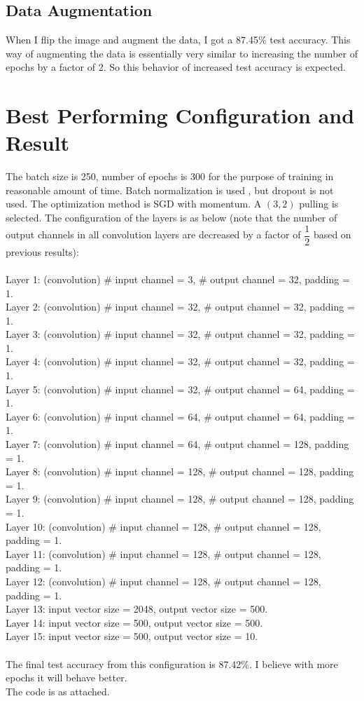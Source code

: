 \subsection{Data Augmentation}
When I flip the image and augment the data, I got a 87.45\% test accuracy. This way of augmenting the data is essentially very similar to increasing the number of epochs by a factor of 2. So this behavior of increased test accuracy is expected. 

\section{Best Performing Configuration and Result}
The batch size is 250, number of epochs is 300 for the purpose of training in reasonable amount of time. Batch normalization is used , but dropout is not used.  The optimization method is SGD with momentum. A $(3,2)$ pulling is selected. The configuration of the layers is as below (note that the number of output channels in all convolution layers are decreased by a factor of $\dfrac{1}{2}$ based on previous results): \\ \\
Layer 1: (convolution) \# input channel = 3, \# output channel = 32,  padding = 1.\\
Layer 2: (convolution) \# input channel = 32, \# output channel = 32,  padding = 1.\\
Layer 3: (convolution) \# input channel = 32, \# output channel = 32,  padding = 1.\\
Layer 4: (convolution) \# input channel = 32, \# output channel = 32,  padding = 1.\\
Layer 5: (convolution) \# input channel = 32, \# output channel = 64,  padding = 1.\\
Layer 6: (convolution) \# input channel = 64, \# output channel = 64,  padding = 1.\\
Layer 7: (convolution) \# input channel = 64, \# output channel = 128,  padding = 1.\\
Layer 8: (convolution) \# input channel = 128, \# output channel = 128,  padding = 1.\\
Layer 9: (convolution) \# input channel = 128, \# output channel = 128,  padding = 1.\\
Layer 10: (convolution) \# input channel = 128, \# output channel = 128,  padding = 1.\\
Layer 11: (convolution) \# input channel = 128, \# output channel = 128,  padding = 1.\\
Layer 12: (convolution) \# input channel = 128, \# output channel = 128,  padding = 1.\\
Layer 13: input vector size = 2048, output vector size = 500.\\
Layer 14: input vector size = 500, output vector size = 500.\\
Layer 15: input vector size = 500, output vector size = 10.\\ 
\\
The final test accuracy from this configuration is 87.42\%. I believe with more epochs it will behave better. 
\\
The code is as attached. 



